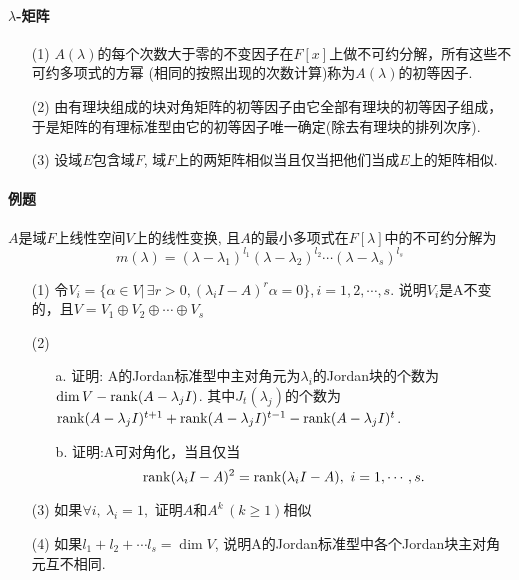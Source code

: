 \paragraph{$\lambda$-矩阵}
\begin{itemize}
    \item[(1)] 
     $A(\lambda)$的每个次数大于零的不变因子在$F[x]$上做不可约分解，所有这些不可约多项式的方幂
     (相同的按照出现的次数计算)称为$A(\lambda)$的初等因子.
    \item[(2)] 由有理块组成的块对角矩阵的初等因子由它全部有理块的初等因子组成，
    于是矩阵的有理标准型由它的初等因子唯一确定(除去有理块的排列次序).  
    \item[(3)] 设域$E$包含域$F$, 域$F$上的两矩阵相似当且仅当把他们当成$E$上的矩阵相似. 
\end{itemize}

\paragraph{例题}
$A$是域$F$上线性空间$V$上的线性变换, 且$A$的最小多项式在$F[\lambda]$中的不可约分解为
$$m(\lambda) = (\lambda-\lambda_1)^{l_1}(\lambda-\lambda_2)^{l_2}\cdots(\lambda-\lambda_s)^{l_s}$$
\begin{itemize}
\item[(1)] 令$V_i = \{\alpha \in V |\,\exists r > 0,
(\lambda_i I - A)^r \alpha = 0\}, i = 1,2,\cdots,s.$
说明$V_i$是A不变的，且$V = V_1 \oplus V_2 \oplus \cdots \oplus V_s$ 
\vspace{3cm}
\item[(2)] 
\begin{itemize}
    \item[a.] 证明: A的Jordan标准型中主对角元为$\lambda_i$的Jordan块的个数为
    $\dim V - \mathrm{rank} (A - \lambda_j I)$.
    其中$J_t(\lambda_j)$的个数为$\mathrm{rank} (A-\lambda_j I)^{t+1} +
    \mathrm{rank} (A-\lambda_j I)^{t-1} - \mathrm{rank} (A-\lambda_j I)^t$.
    \vspace{3cm}
    \item[b.] 证明:A可对角化，当且仅当$$ \mathrm{rank} (\lambda_iI -A)^2 = 
    \mathrm{rank} (\lambda_iI - A),\ i=1,\cdots,s. $$ 
    \vspace{3cm}
\end{itemize}

\item[(3)]如果$\forall i,\ \lambda_i = 1,$ 证明$A$和$A^k\,(k\ge 1)$相似
\vspace{3cm}

\item[(4)] 如果$l_1 + l_2 +\cdots l_s = \dim V$, 说明A的Jordan标准型中各个Jordan块主对角元互不相同. 
\vspace{3cm}
\end{itemize}

